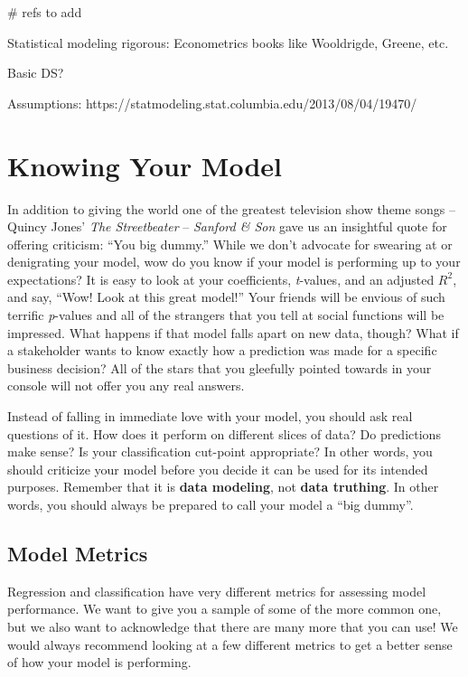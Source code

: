 \documentclass[
  letterpaper,
]{krantz}
\begin{document}
\# refs to add

Statistical modeling rigorous: Econometrics books like Wooldrigde,
Greene, etc.

Basic DS?

Assumptions: https://statmodeling.stat.columbia.edu/2013/08/04/19470/

\chapter{Knowing Your Model}\label{knowing-your-model}

In addition to giving the world one of the greatest television show
theme songs -- Quincy Jones' \emph{The Streetbeater} -- \emph{Sanford \&
Son} gave us an insightful quote for offering criticism: ``You big
dummy.'' While we don't advocate for swearing at or denigrating your
model, wow do you know if your model is performing up to your
expectations? It is easy to look at your coefficients, \emph{t}-values,
and an adjusted \(R^2\), and say, ``Wow! Look at this great model!''
Your friends will be envious of such terrific \emph{p}-values and all of
the strangers that you tell at social functions will be impressed. What
happens if that model falls apart on new data, though? What if a
stakeholder wants to know exactly how a prediction was made for a
specific business decision? All of the stars that you gleefully pointed
towards in your console will not offer you any real answers.

Instead of falling in immediate love with your model, you should ask
real questions of it. How does it perform on different slices of data?
Do predictions make sense? Is your classification cut-point appropriate?
In other words, you should criticize your model before you decide it can
be used for its intended purposes. Remember that it is \textbf{data
modeling}, not \textbf{data truthing}. In other words, you should always
be prepared to call your model a ``big dummy''.

\section{Model Metrics}\label{model-metrics-1}

Regression and classification have very different metrics for assessing
model performance. We want to give you a sample of some of the more
common one, but we also want to acknowledge that there are many more
that you can use! We would always recommend looking at a few different
metrics to get a better sense of how your model is performing.
\end{document}
